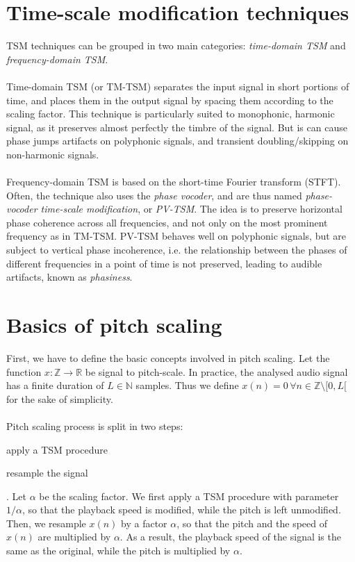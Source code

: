 \documentclass[letterpaper]{article}
\begin{document}
\section{Time-scale modification techniques}
TSM techniques can be grouped in two main categories: \emph{time-domain TSM} and
\emph{frequency-domain TSM}.
\paragraph{}
Time-domain TSM (or TM-TSM) separates the input signal in short portions of
time, and places them in the output signal by spacing them according to the
scaling factor. This technique is particularly suited to monophonic, harmonic
signal, as it preserves almost perfectly the timbre of the signal. But is can
cause phase jumps artifacts on polyphonic signals, and transient
doubling/skipping on non-harmonic signals.
\paragraph{}
Frequency-domain TSM is based on the short-time Fourier transform (STFT). Often,
the technique also uses the \emph{phase vocoder}, and are thus named
\emph{phase-vocoder time-scale modification}, or \emph{PV-TSM}. The idea is
to preserve horizontal phase coherence across all frequencies, and not only on
the most prominent frequency as in TM-TSM. PV-TSM behaves well on polyphonic
signals, but are subject to vertical phase incoherence, i.e. the relationship
between the phases of different frequencies in a point of time is not preserved,
leading to audible artifacts, known as \emph{phasiness}.

\section{Basics of pitch scaling}
First, we have to define the basic concepts involved in pitch scaling. Let the
function \(x:\mathbb{Z}\to\mathbb{R}\) be signal to pitch-scale. In practice,
the analysed audio signal has a finite duration of \(L\in\mathbb{N}\) samples.
Thus we define \(x(n)=0\,\forall n\in\mathbb{Z}\setminus[0,L[\) for the sake of
simplicity.
\paragraph{}
Pitch scaling process is split in two steps: \begin{enumerate*}[label=\arabic*)]
\item apply a TSM procedure \item resample the signal\end{enumerate*}. Let
\(\alpha\) be the scaling factor. We first apply a TSM procedure with parameter
\(1/\alpha\), so that the playback speed is modified, while the pitch is left
unmodified. Then, we resample \(x(n)\) by a factor \(\alpha\), so that the
pitch and the speed of \(x(n)\) are multiplied by \(\alpha\). As a result,
the playback speed of the signal is the same as the original, while the pitch is
multiplied by \(\alpha\).
\end{document}
